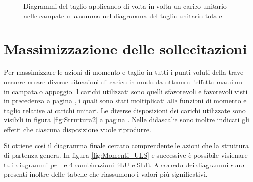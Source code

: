 \begin{figure}[p]
\caption{Diagrammi del taglio applicando di volta in volta un carico unitario nelle campate e la somma nel diagramma del taglio unitario totale}
\label{fig:TagliUnitari}
\end{figure}
\clearpage %
\section{Massimizzazione delle sollecitazioni}
Per massimizzare le azioni di momento e taglio in tutti i punti voluti della trave occorre creare diverse situazioni di carico in modo da ottenere l'effetto massimo in campata o appoggio.
I carichi utilizzati sono quelli sfavorevoli e favorevoli visti in precedenza a pagina \pageref{cap:combinazioniCarico}, i quali sono stati moltiplicati alle funzioni di momento e taglio relative ai carichi unitari.
Le diverse  disposizioni dei carichi utilizzate sono visibili in figura \ref{fig:Struttura2} a pagina \pageref{fig:Struttura2}.
Nelle didascalie sono inoltre indicati gli effetti che ciascuna disposizione vuole riprodurre.


Si ottiene così il diagramma finale cercato comprendente le azioni che la struttura di partenza genera.
In figura \ref{fig:Momenti_ULS} e successive è possibile visionare tali diagrammi per le 4 combinazioni SLU e SLE. 
A corredo dei diagrammi sono presenti inoltre delle tabelle che riassumono i valori più significativi.


